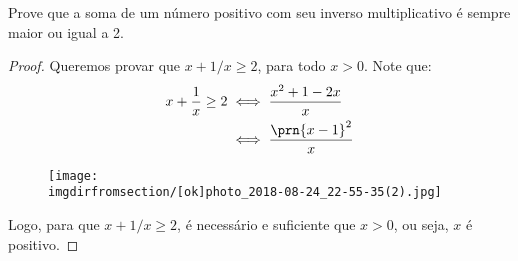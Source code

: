 \begin{example}
    Prove que a soma de um número positivo com seu inverso multiplicativo é sempre maior ou igual a 2.
\end{example}

\begin{proof}
    Queremos provar que $x+1/x\ge 2$, para todo $x > 0$. Note que:
    \begin{align*}
        x+\dfrac{1}{x}\ge 2 &\iff \dfrac{x^2+1-2x}{x}       \\
                            &\iff \dfrac{\prn{x-1}^2}{x}
    \end{align*}

    \begin{figure}[H]
        \centering
        \texttt{[image: \\imgdirfromsection/[ok]photo\_2018-08-24\_22-55-35(2).jpg]}
        \caption{}
    \end{figure}

    Logo, para que $x+1/x\ge 2$, é necessário e suficiente que $x > 0$, ou seja, $x$ é positivo.
\end{proof}